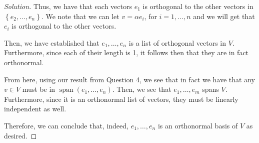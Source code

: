 \documentclass{article}
\newenvironment{solution}{\begin{proof}[Solution]}{\end{proof}}
\DeclareMathOperator*{\vspan}{\mathrm{span}}
\begin{document}
\begin{solution}
		Thus, we have that each vectors $e_{1}$ is orthogonal to the other vectors in $\left\{  e_{2}, \ldots, e_{n} \right\}$. We note that we can let $v = \alpha e_{i}$, for $i = 1, \ldots, n$ and we will get that $e_{i}$ is orthogonal to the other vectors.
		
		Then, we have established that $e_{1}, \ldots, e_{n}$ is a list of orthogonal vectors in $V$. Furthermore, since each of their length is 1, it follows then that they are in fact orthonormal.
		
		From here, using our result from Question 4, we see that in fact we have that any $v \in V$ must be in $\vspan(e_{1}, \ldots, e_{n})$. Then, we see that $e_{1}, \ldots, e_{m}$ spans $V$. Furthermore, since it is an orthonormal list of vectors, they must be linearly independent as well.
		
		Therefore, we can conclude that, indeed, $e_{1}, \ldots, e_{n}$ is an orthonormal basis of $V$ as desired.
	\end{solution}
\end{document}
